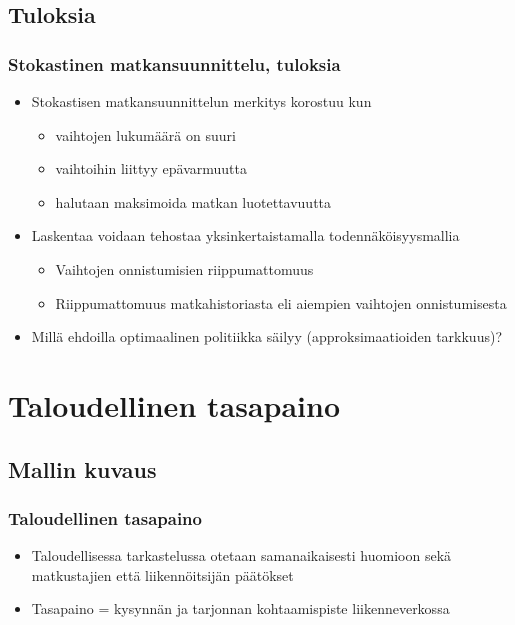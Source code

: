 \documentclass{beamer}
\newcommand*{\secpage}{\usebeamertemplate*{section pages}}
\begin{document}
    \subsection{Tuloksia}
        \begin{frame}
  \frametitle{Stokastinen matkansuunnittelu, tuloksia} 
  \begin{itemize}
   \item 
Stokastisen matkansuunnittelun merkitys korostuu kun 
\begin{itemize}
 \item 
vaihtojen lukumäärä on suuri 
\item
vaihtoihin liittyy epävarmuutta
\item
halutaan maksimoida matkan luotettavuutta
\end{itemize}
\item
Laskentaa voidaan tehostaa yksinkertaistamalla todennäköisyysmallia
\begin{itemize}
 \item 
Vaihtojen onnistumisien riippumattomuus
\item
Riippumattomuus matkahistoriasta eli aiempien vaihtojen onnistumisesta
\end{itemize}
\item
Millä ehdoilla optimaalinen politiikka säilyy (approksimaatioiden tarkkuus)?
\end{itemize}

    \end{frame}     
    
    
\section{Taloudellinen tasapaino}
\frame{\secpage}
\subsection{Mallin kuvaus}
\begin{frame}
  \frametitle{Taloudellinen tasapaino} 
  \begin{itemize}
   \item 
   Taloudellisessa tarkastelussa otetaan samanaikaisesti huomioon sekä matkustajien että liikennöitsijän päätökset
   \item
   Tasapaino = kysynnän ja tarjonnan kohtaamispiste liikenneverkossa
   \end{itemize}
    \end{frame}   
    
\end{document}
